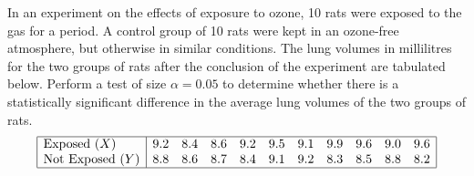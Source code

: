 %
%
%
%



\begin{example}
In an experiment on the effects of exposure to ozone, 10 rats were exposed to the gas for a period. A control group of 10 rats were kept in an ozone-free atmosphere, but otherwise in similar conditions. The lung volumes in millilitres for the two groups of rats after the conclusion of the experiment are tabulated below. Perform a test of size $\alpha=0.05$ to determine whether there is a statistically significant difference in the average lung volumes of the two groups of rats. 
\[\begin{array}{|l|cccccccccc|} \hline
\text{Exposed } (X)		& 9.2    & 8.4    & 8.6    & 9.2    & 9.5    & 9.1    & 9.9    & 9.6    & 9.0    & 9.6 \\
\text{Not Exposed } (Y)	& 8.8    & 8.6    & 8.7    & 8.4    & 9.1    & 9.2    & 8.3    & 8.5    & 8.8    & 8.2 \\ \hline
\end{array}\]
\end{example}

